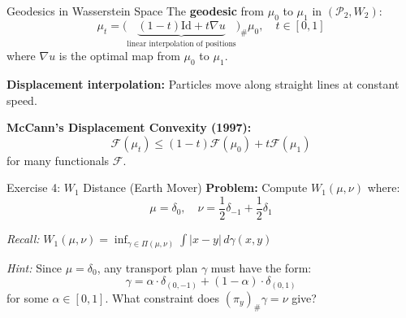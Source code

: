\documentclass[aspectratio=169]{beamer}
\begin{document}
\begin{frame}{Geodesics in Wasserstein Space}
The \textbf{geodesic} from $\mu_0$ to $\mu_1$ in $(\mathcal{P}_2, W_2)$:
\[
\mu_t = \bigl(\underbrace{(1-t)\text{Id} + t\nabla u}_{\text{linear interpolation of positions}}\bigr)_\# \mu_0, \quad t \in [0,1]
\]
where $\nabla u$ is the optimal map from $\mu_0$ to $\mu_1$.

\vspace{0.3cm}
\begin{center}
\end{center}

\vspace{0.2cm}
\textbf{Displacement interpolation:} Particles move along straight lines at constant speed.

\vspace{0.2cm}
\textbf{McCann's Displacement Convexity (1997):}
\[
\mathcal{F}(\mu_t) \leq (1-t)\mathcal{F}(\mu_0) + t\mathcal{F}(\mu_1)
\]
for many functionals $\mathcal{F}$.
\end{frame}

\begin{frame}{Exercise 4: $W_1$ Distance (Earth Mover)}
\textbf{Problem:} Compute $W_1(\mu, \nu)$ where:
\[
\mu = \delta_0, \quad \nu = \frac{1}{2}\delta_{-1} + \frac{1}{2}\delta_{1}
\]

\vspace{0.5cm}
\textit{Recall:} $W_1(\mu,\nu) = \inf_{\gamma \in \Pi(\mu,\nu)} \int |x-y| \, d\gamma(x,y)$

\vspace{0.5cm}
\textit{Hint:} Since $\mu = \delta_0$, any transport plan $\gamma$ must have the form:
\[
\gamma = \alpha \cdot \delta_{(0,-1)} + (1-\alpha) \cdot \delta_{(0,1)}
\]
for some $\alpha \in [0,1]$. What constraint does $(\pi_y)_\#\gamma = \nu$ give?
\end{frame}
\end{document}
